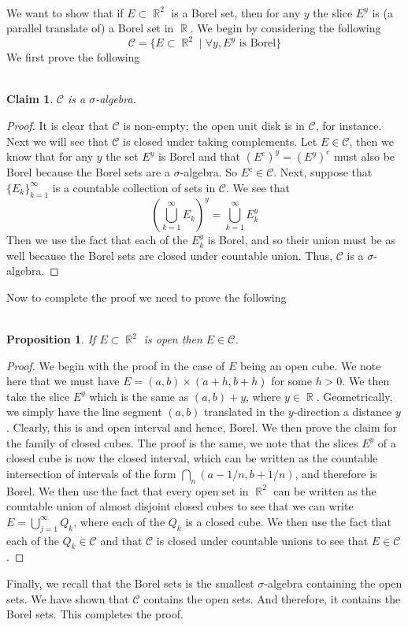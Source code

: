 \documentclass{article}
\DeclareMathOperator{\R}{\mathbb{R}}
\DeclareMathOperator{\suchthat}{\mathrel{|}}
\newcommand{\problem}[1]{\noindent{\textbf{Problem #1}}\\}
\newtheorem*{claim}{\\ Claim}
\newtheorem*{prop}{\\ Proposition}
\begin{document}
\problem{2.5.20}
We want to show that if $E\subset \R^2$ is a Borel set, then for any $y$ the slice $E^y$ is (a parallel translate of) a Borel set in $\R$. We begin by considering the following
\[
\mathcal{C} = \{E \subset \R^2 \suchthat \forall y, E^y \text{ is Borel}\}
\] 
We first prove the following
\begin{claim}
$\mathcal{C}$ is a $\sigma$-algebra.
\end{claim}
\begin{proof}
It is clear that $\mathcal{C}$ is non-empty; the open unit disk is in $\mathcal{C}$, for instance. Next we will see that $\mathcal{C}$ is closed under taking complements. Let $E \in \mathcal{C}$, then we know that for any $y$ the set $E^y$ is Borel and that $(E^c)^y = (E^y)^c$ must also be Borel because the Borel sets are a $\sigma$-algebra. So $E^c \in \mathcal{C}$. Next, suppose that $\{E_k\}_{k=1}^\infty$ is a countable collection of sets in $\mathcal{C}$. We see that
\[
\left(\bigcup_{k=1}^\infty E_k \right)^y = \bigcup_{k=1}^\infty E_k^y
\]
Then we use the fact that each of the $E_k^y$ is Borel, and so their union must be as well because the Borel sets are closed under countable union. Thus, $\mathcal{C}$ is a $\sigma$-algebra.
\end{proof}
Now to complete the proof we need to prove the following
\begin{prop}
If $E\subset \R^2$ is open then $E \in \mathcal{C}$.
\end{prop}
\begin{proof}
We begin with the proof in the case of $E$ being an open cube. We note here that we must have $E = (a,b) \times (a+h,b+h)$ for some $h > 0$. We then take the slice $E^y$ which is the same as $(a,b) + y$, where $y \in \R$. Geometrically, we simply have the line segment $(a,b)$ translated in the $y$-direction a distance $y$. Clearly, this is and open interval and hence, Borel. We then prove the claim for the family of closed cubes. The proof is the same, we note that the slices $E^y$ of a closed cube is now the closed interval, which can be written as the countable intersection of intervals of the form $\bigcap_{n} (a- 1/n, b+ 1/n)$, and therefore is Borel. We then use the fact that every open set in $\R^2$ can be written as the countable union of almost disjoint closed cubes to see that we can write $E = \bigcup_{j=1}^\infty Q_k$, where each of the $Q_k$ is a closed cube. We then use the fact that each of the $Q_k \in \mathcal{C}$ and that $\mathcal{C}$ is closed under countable unions to see that $E\in \mathcal{C}$. 
\end{proof}
Finally, we recall that the Borel sets is the smallest $\sigma$-algebra containing the open sets. We have shown that $\mathcal{C}$ contains the open sets. And therefore, it contains the Borel sets. This completes the proof. 
\pagebreak
\end{document}
